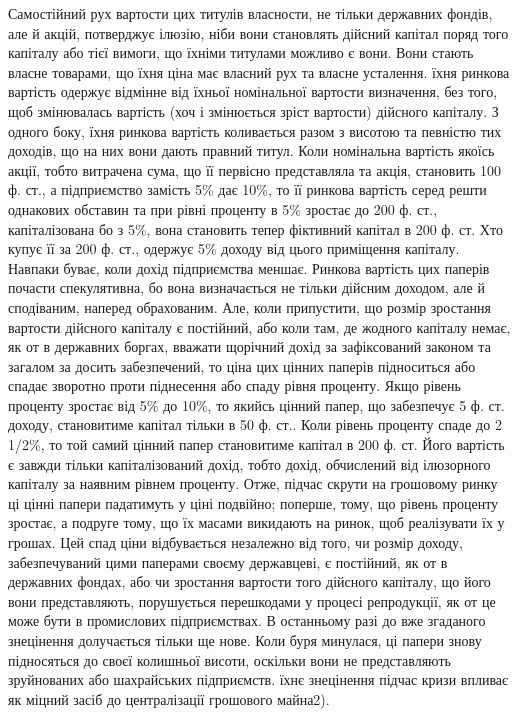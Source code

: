 Самостійний рух вартости цих титулів власности, не тільки державних
фондів, але й акцій, потверджує ілюзію, ніби вони становлять дійсний капітал
поряд того капіталу або тієї вимоги, що їхніми титулами можливо є вони.
Вони стають власне товарами, що їхня ціна має власний рух та власне усталення.
їхня ринкова вартість одержує відмінне від їхньої номінальної вартости
визначення, без того, щоб змінювалась вартість (хоч і змінюється зріст вартости)
дійсного капіталу. З одного боку, їхня ринкова вартість коливається разом з
висотою та певністю тих доходів, що на них вони дають правний титул. Коли
номінальна вартість якоїсь акції, тобто витрачена сума, що її первісно представляла
та акція, становить 100 ф. ст., а підприємство замість 5\% дає 10\%,
то її ринкова вартість серед решти однакових обставин та при рівні проценту
в 5\% зростає до 200 ф. ст., капіталізована бо з 5\%, вона становить тепер фіктивний
капітал в 200 ф. ст. Хто купує її за 200 ф. ст., одержує 5\% доходу
від цього приміщення капіталу. Навпаки буває, коли дохід підприємства меншає.
Ринкова вартість цих паперів почасти спекулятивна, бо вона визначається не
тільки дійсним доходом, але й сподіваним, наперед обрахованим. Але, коли припустити,
що розмір зростання вартости дійсного капіталу є постійний, або коли там,
де жодного капіталу немає, як от в державних боргах, вважати щорічний дохід
за зафіксований законом та загалом за досить забезпечений, то ціна цих цінних
паперів підноситься або спадає зворотно проти піднесення або спаду
рівня проценту. Якщо рівень проценту зростає від 5\% до 10\%, то якийсь
цінний папер, що забезпечує 5 ф. ст. доходу, становитиме капітал тільки
в 50 ф. ст.. Коли рівень проценту спаде до 2 1/2\%, то той самий цінний
папер становитиме капітал в 200 ф. ст. Його вартість є завжди тільки капіталізований
дохід, тобто дохід, обчислений від ілюзорного капіталу за наявним
рівнем проценту. Отже, підчас скрути на грошовому ринку ці цінні папери
падатимуть у ціні подвійно; поперше, тому, що рівень проценту зростає, а подруге
тому, що їх масами викидають на ринок, щоб реалізувати їх у грошах.
Цей спад ціни відбувається незалежно від того, чи розмір доходу, забезпечуваний
цими паперами своєму державцеві, є постійний, як от в державних фондах,
або чи зростання вартости того дійсного капіталу, що його вони представляють,
порушується перешкодами у процесі репродукції, як от це може бути в промислових
підприємствах. В останньому разі до вже згаданого знецінення долучається
тільки ще нове. Коли буря минулася, ці папери знову підносяться до своєї
колишньої висоти, оскільки вони не представляють зруйнованих або шахрайських
підприємств. їхнє знецінення підчас кризи впливає як міцний засіб до централізації
грошового майна2).

